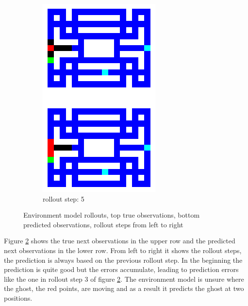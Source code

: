 \begin{figure}[H]
\begin{subfigure}[b]{0.16\textwidth}
        \includegraphics[width=\textwidth]{./Images/env_model_rollout_5.png}
  		\caption*{\footnotesize rollout step: 5} 
  		\label{fig:rollout_5}
    \end{subfigure} 
    \caption{Environment model rollouts, top true observations, bottom predicted observations, rollout steps from left to right}\label{fig:environment_model_rollouts}
\end{figure}

Figure \ref{fig:environment_model_rollouts} shows the true next observations in the upper row and the predicted next observations in the lower row. From left to right it shows the rollout steps, the prediction is always based on the previous rollout step. In the beginning the prediction is quite good but the errors accumulate, leading to prediction errors like the one in rollout step 3 of figure \ref{fig:environment_model_rollouts}. The environment model is unsure where the ghost, the red points, are moving and as a result it predicts the ghost at two positions.\\


